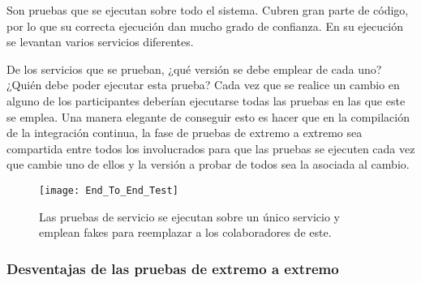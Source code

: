 \documentclass[11pt,a4paper]{article}
\begin{document}
Son pruebas que se ejecutan sobre todo el sistema. Cubren gran parte de código, por lo que su correcta ejecución dan mucho grado de confianza. En su ejecución se levantan varios servicios diferentes.

De los servicios que se prueban, ¿qué versión se debe emplear de cada uno? ¿Quién debe poder ejecutar esta prueba? Cada vez que se realice un cambio en alguno de los participantes deberían ejecutarse todas las pruebas en las que este se emplea. Una manera elegante de conseguir esto es hacer que en la compilación de la integración continua, la fase de pruebas de extremo a extremo sea compartida entre todos los involucrados para que las pruebas se ejecuten cada vez que cambie uno de ellos y la versión a probar de todos sea la asociada al cambio.

\begin{figure}[h]
\centering
\texttt{[image: End\_To\_End\_Test]}
\caption{Las pruebas de servicio se ejecutan sobre un único servicio y emplean fakes para reemplazar a los colaboradores de este.}
\end{figure}

\subsubsection{Desventajas de las pruebas de extremo a extremo}
\end{document}
